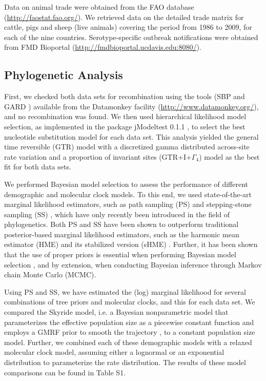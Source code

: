 \documentclass[10pt]{article}
\begin{document}
Data on animal trade were obtained from the FAO database (\url{http://faostat.fao.org/}). We retrieved data on the detailed trade matrix for cattle, pigs and sheep (live animals) covering the period from 1986 to 2009, for each of the nine countries. Serotype-specific outbreak notifications were obtained from FMD Bioportal (\url{http://fmdbioportal.ucdavis.edu:8080/}).


\subsection*{Phylogenetic Analysis}

First, we checked both data sets for recombination using the tools (SBP and GARD \cite{sbpgard}) available from the Datamonkey facility (\url{http://www.datamonkey.org/}), and no recombination was found. We then used hierarchical likelihood model selection, as implemented in the package jModeltest 0.1.1 \cite{jmodel}, to select the best nucleotide 
substitution model for each data set. This analysis yielded the general time reversible (GTR) model with a discretized gamma distributed across-site rate variation and a proportion of invariant sites (GTR+I+$\Gamma_{4}$) model as the best fit for both data sets.

We performed Bayesian model selection to assess the performance of different demographic and molecular clock models.
To this end, we used state-of-the-art marginal likelihood estimators, such as path sampling (PS) \cite{LartillotPhilippe} and stepping-stone sampling (SS) \cite{Xie}, which have only recently been introduced in the field of phylogenetics.
Both PS and SS have been shown to outperform traditional posterior-based marginal likelihood estimators, such as the harmonic mean estimator (HME) and its stabilized version (sHME) \cite{LartillotPhilippe,Xie,Baele2012,Baele2013a,Baele2013b}.
Further, it has been shown that the use of proper priors is essential when performing Bayesian model selection \cite{Baele2013a}, and by extension, when conducting Bayesian inference through Markov chain Monte Carlo (MCMC).
                                                                       

Using PS and SS, we have estimated the (log) marginal likelihood for several combinations of tree priors and molecular clocks, and this for each data set.
We compared the Skyride model, i.e. a Bayesian nonparametric model that parameterizes the effective population size as a piecewise constant function and employs a GMRF prior to smooth the trajectory \cite{skygrid}, to a constant population size model.
Further, we combined each of these demographic models with a relaxed molecular clock model, assuming either a lognormal or an exponential distribution to parameterize the rate distribution.
The results of these model comparisons can be found in Table S1.
\end{document}
